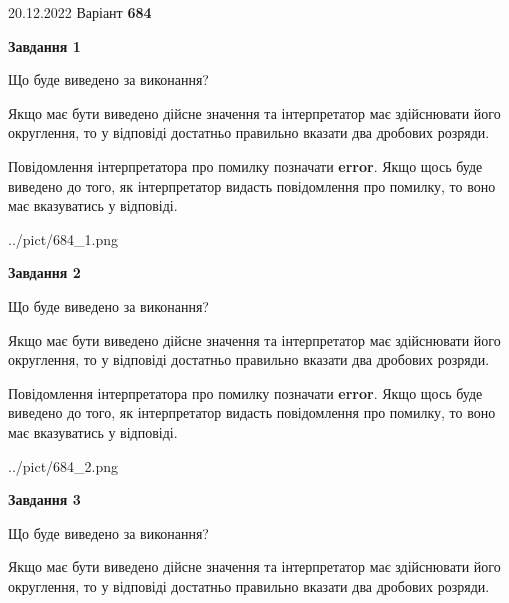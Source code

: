 \documentclass[12pt, ukrainian]{article}
\begin{document}
{20.12.2022 Варіант \No \textbf { 684 }\par}
{
\begin {Large}

{\begin {center}\textbf{Завдання 1}\end {center}}\par
Що буде виведено за виконання? \par

Якщо має бути виведено дійсне значення та інтерпретатор має здійснювати його округлення, 
то у відповіді достатньо правильно вказати два дробових розряди.

Повідомлення інтерпретатора про помилку позначати \textbf{error}.
Якщо щось буде виведено до того, як інтерпретатор видасть повідомлення про помилку, 
то воно має вказуватись у відповіді. \par

\begin{center}
	{../pict/684_1.png}
\end{center}
\newpage

{\begin {center}\textbf{Завдання 2}\end {center}}\par
Що буде виведено за виконання? \par

Якщо має бути виведено дійсне значення та інтерпретатор має здійснювати його округлення, 
то у відповіді достатньо правильно вказати два дробових розряди.

Повідомлення інтерпретатора про помилку позначати \textbf{error}.
Якщо щось буде виведено до того, як інтерпретатор видасть повідомлення про помилку, 
то воно має вказуватись у відповіді. \par

\begin{center}
	{../pict/684_2.png}
\end{center}
\newpage

{\begin {center}\textbf{Завдання 3}\end {center}}\par
Що буде виведено за виконання? \par

Якщо має бути виведено дійсне значення та інтерпретатор має здійснювати його округлення, 
то у відповіді достатньо правильно вказати два дробових розряди.


\end{Large}}
\end{document}
